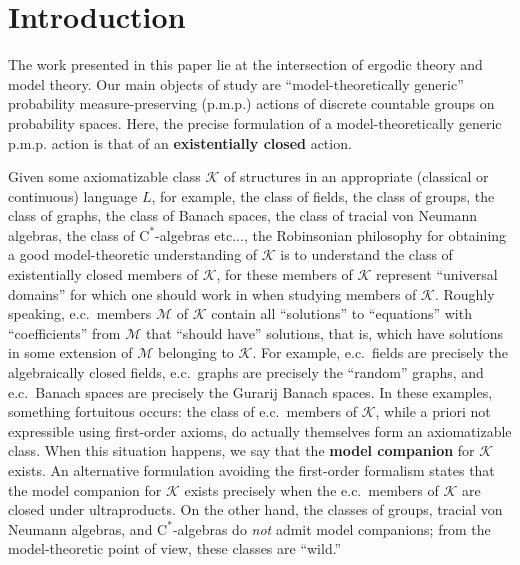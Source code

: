 \documentclass[12pt]{amsart}
\theoremstyle{definition}
\def\cal{\mathcal}
\newcommand{\cstar}{$\mathrm{C}^*$}
\newcommand{\pmp}{p{$.$}m{$.$}p{$.$}}
\begin{document}
\maketitle




\tableofcontents
\section{Introduction}

The work presented in this paper lie at the intersection of ergodic theory and model theory.  Our main objects of study are ``model-theoretically generic'' probability measure-preserving (\pmp) actions of discrete countable groups on probability spaces.  Here, the precise formulation of a model-theoretically generic {\pmp} action is that of an \textbf{existentially closed} action.

Given some axiomatizable class $\cal K$ of structures in an appropriate (classical or continuous) language $L$, for example, the class of fields, the class of groups, the class of graphs, the class of Banach spaces, the class of tracial von Neumann algebras, the class of \cstar-algebras etc..., the Robinsonian philosophy for obtaining a good model-theoretic understanding of $\cal K$ is to understand the class of existentially closed members of $\cal K$, for these members of $\cal K$ represent ``universal domains'' for which one should work in when studying members of $\cal K$.  Roughly speaking, e.c.\ members $\cal M$ of $\cal K$ contain all ``solutions'' to ``equations'' with ``coefficients'' from $\cal M$ that ``should have'' solutions, that is, which have solutions in some extension of $\cal M$ belonging to $\cal K$.  For example, e.c.\ fields are precisely the algebraically closed fields, e.c.\ graphs are precisely the ``random'' graphs, and e.c.\ Banach spaces are precisely the Gurarij Banach spaces.  In these examples, something fortuitous occurs:  the class of e.c.\ members of $\cal K$, while a priori not expressible using first-order axioms, do actually themselves form an axiomatizable class.  When this situation happens, we say that the \textbf{model companion} for $\cal K$ exists.  An alternative formulation avoiding the first-order formalism states that the model companion for $\cal K$ exists precisely when the e.c.\ members of $\cal K$ are closed under ultraproducts.  On the other hand, the classes of groups, tracial von Neumann algebras, and \cstar-algebras do \emph{not} admit model companions; from the model-theoretic point of view, these classes are ``wild.''
\end{document}
